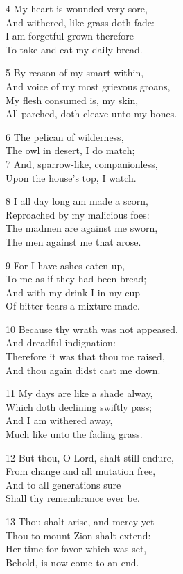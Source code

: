 4 My heart is wounded very sore,\\
And withered, like grass doth fade:\\
I am forgetful grown therefore\\
To take and eat my daily bread.

5 By reason of my smart within,\\
And voice of my most grievous groans,\\
My flesh consumed is, my skin,\\
All parched, doth cleave unto my bones.

6 The pelican of wilderness,\\
The owl in desert, I do match;\\
7 And, sparrow-like, companionless,\\
Upon the house’s top, I watch.

8 I all day long am made a scorn,\\
Reproached by my malicious foes:\\
The madmen are against me sworn,\\
The men against me that arose.

9 For I have ashes eaten up,\\
To me as if they had been bread;\\
And with my drink I in my cup\\
Of bitter tears a mixture made.

10 Because thy wrath was not appeased,\\
And dreadful indignation:\\
Therefore it was that thou me raised,\\
And thou again didst cast me down.

11 My days are like a shade alway,\\
Which doth declining swiftly pass;\\
And I am withered away,\\
Much like unto the fading grass.

12 But thou, O Lord, shalt still endure,\\
From change and all mutation free,\\
And to all generations sure\\
Shall thy remembrance ever be.

13 Thou shalt arise, and mercy yet\\
Thou to mount Zion shalt extend:\\
Her time for favor which was set,\\
Behold, is now come to an end.

